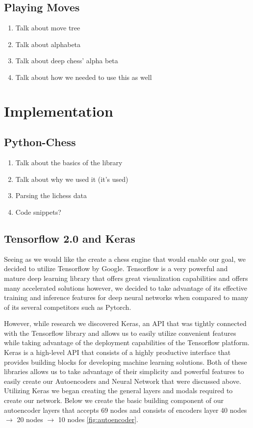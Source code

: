 \documentclass[12pt]{article}
\begin{document}
    \subsection{Playing Moves}

    \begin{enumerate}
        \item Talk about move tree 
        \item Talk about alphabeta
        \item Talk about deep chess' alpha beta 
        \item Talk about how we needed to use this as well 
    \end{enumerate}
    
    \section{Implementation}

    \subsection{Python-Chess}

    \begin{enumerate}
        \item Talk about the basics of the library
        \item Talk about why we used it (it's used)
        \item Parsing the lichess data
        \item Code snippets?
    \end{enumerate}

    \subsection{Tensorflow 2.0 and Keras}

    Seeing as we would like the create a chess engine that would enable our goal, we decided to utilize Tensorflow by Google. Tensorflow is a very powerful and mature deep learning library that offers great visualization capabilities and offers many accelerated solutions however, we decided to take advantage of its effective training and inference features for deep neural networks when compared to many of its several competitors such as Pytorch. 

    However, while research we discovered Keras, an API that was tightly connected with the Tensorflow library and allows us to easily utilize convenient features while taking advantage of the deployment capabilities of the Tensorflow platform. Keras is a high-level API that consists of a highly productive interface that provides building blocks for developing machine learning solutions. Both of these libraries allows us to take advantage of their simplicity and powerful features to easily create our Autoencoders and Neural Network that were discussed above. Utilizing Keras we began creating the general layers and modals required to create our network. Below we create the basic building component of our autoencoder layers that accepts 69 nodes and consists of encoders layer 40 nodes $\rightarrow$ 20 nodes $\rightarrow$ 10 nodes \ref{fig:autoencoder}.
\end{document}
